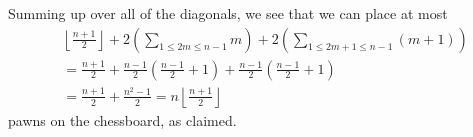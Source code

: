 \documentclass{article}
\begin{document}
\begin{enumerate}
{Summing up over all of the diagonals, we see that we can place at most
\begin{align*}
	& \left\lfloor \frac{n + 1}{2} \right\rfloor + 2 \left( \sum_{1 \leq 2m \leq n - 1} m \right) + 2 \left( \sum_{1 \leq 2m + 1 \leq n - 1} (m + 1) \right) \\
	& = \frac{n + 1}{2} + \frac{n - 1}{2} \left( \frac{n - 1}{2} + 1 \right) + \frac{n - 1}{2} \left( \frac{n - 1}{2} + 1 \right) \\
	& = \frac{n + 1}{2} + \frac{n^2 - 1}{2} = n \left\lfloor \frac{n + 1}{2} \right\rfloor
\end{align*}
pawns on the chessboard, as claimed.
}


\end{enumerate}
\end{document}
